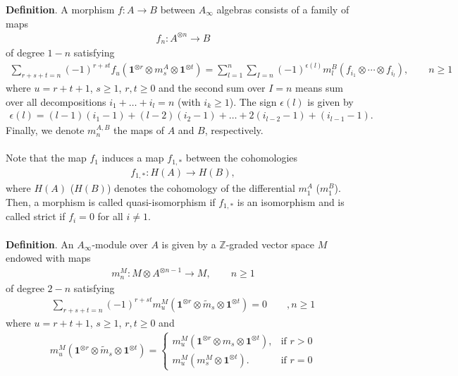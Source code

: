 \documentclass[a4paper,11pt]{article}
\numberwithin{equation}{section}
\begin{document}
\textbf{Definition}. A morphism $f:A\rightarrow B$ between $A_{\infty}$ 
algebras consists of a family of maps 
\begin{eqnarray}
f_{n}:A^{\otimes n}\rightarrow B
\end{eqnarray}
of degree $1-n$ satisfying
\begin{eqnarray}\label{ainftyrelsmor}
\sum_{r+s+t=n}(-1)^{r+st}f_{u}(\mathbf{1}^{\otimes r}\otimes m^{A}_{s}\otimes 
\mathbf{1}^{\otimes 
t})=\sum_{l=1}^{n}\sum_{I=n}(-1)^{\epsilon(l)}m^{B}_{l}(f_{i_{1}}
\otimes\cdots\otimes f_{i_{l}}),\qquad n\geq 1
\end{eqnarray}
where $u=r+t+1$, $s\geq 1$, $r,t\geq 0$ and the second sum over $I=n$ means sum 
over all decompositions $i_{1}+\ldots +i_{l}=n$ (with $i_{k}\geq 1$). The sign 
$\epsilon(l)$ is given by
\begin{eqnarray}
\epsilon(l)=(l-1)(i_{1}-1)+(l-2)(i_{2}-1)+\ldots+2(i_{l-2}-1)+(i_{l-1}-1).
\end{eqnarray}
Finally, we denote $m^{A,B}_{n}$ the maps of $A$ and $B$, respectively.
\\\\
Note that the map $f_{1}$ induces a map $f_{1,*}$ between the cohomologies
\begin{eqnarray}
f_{1,*}:H(A)\rightarrow H(B),
\end{eqnarray}
where $H(A)$ ($H(B)$) denotes the cohomology of the differential $m^{A}_{1}$ 
($m^{B}_{1}$). Then, a morphism is called quasi-isomorphism if $f_{1,*}$ is an 
isomorphism and is called strict if $f_{i}=0$ for all $i\neq 1$.
\\\\
\textbf{Definition}. An $A_{\infty}$-module over $A$ is given by a 
$\mathbb{Z}$-graded vector space $M$ endowed with maps 
\begin{eqnarray}
m^{M}_{n}:M\otimes A^{\otimes n-1}\rightarrow M,\qquad n\geq 1
\end{eqnarray}
of degree $2-n$ satisfying
\begin{eqnarray}
\sum_{r+s+t=n}(-1)^{r+st}m^{M}_{u}(\mathbf{1}^{\otimes r}\otimes 
\tilde{m}_{s}\otimes 
\mathbf{1}^{\otimes t})=0\qquad, n\geq 1
\end{eqnarray}
where $u=r+t+1$, $s\geq 1$, $r,t\geq 0$ and 
\begin{eqnarray}
m^{M}_{u}(\mathbf{1}^{\otimes r}\otimes 
\tilde{m}_{s}\otimes 
\mathbf{1}^{\otimes t})=\begin{cases}
                   m^{M}_{u}(\mathbf{1}^{\otimes r}\otimes m_{s}\otimes 
\mathbf{1}^{\otimes t}), & \text{if } 
r>0\\
                   m^{M}_{u}( 
m^{M}_{s}\otimes 
\mathbf{1}^{\otimes t}). &  
\text{if } r=0
                  \end{cases}
\end{eqnarray}
\end{document}
